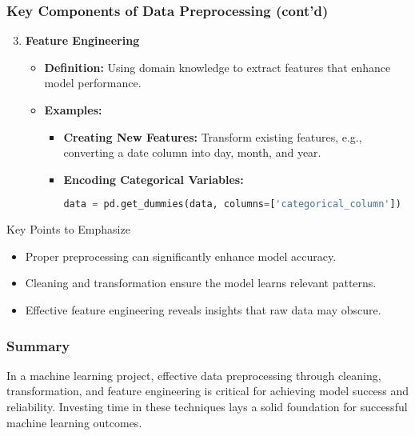 \documentclass[aspectratio=169]{beamer}
\begin{document}
\begin{frame}[fragile]
    \frametitle{Key Components of Data Preprocessing (cont'd)}
    \begin{enumerate}
        \setcounter{enumi}{2}
        \item \textbf{Feature Engineering}
        \begin{itemize}
            \item \textbf{Definition:} Using domain knowledge to extract features that enhance model performance.
            \item \textbf{Examples:}
            \begin{itemize}
                \item \textbf{Creating New Features:} Transform existing features, e.g., converting a date column into day, month, and year.
                \item \textbf{Encoding Categorical Variables:}
                \begin{lstlisting}[language=Python]
data = pd.get_dummies(data, columns=['categorical_column'])
                \end{lstlisting}
            \end{itemize}
        \end{itemize}
    \end{enumerate}

    \begin{block}{Key Points to Emphasize}
        \begin{itemize}
            \item Proper preprocessing can significantly enhance model accuracy.
            \item Cleaning and transformation ensure the model learns relevant patterns.
            \item Effective feature engineering reveals insights that raw data may obscure.
        \end{itemize}
    \end{block}
\end{frame}

\begin{frame}
    \frametitle{Summary}
    In a machine learning project, effective data preprocessing through cleaning, transformation, and feature engineering is critical for achieving model success and reliability. Investing time in these techniques lays a solid foundation for successful machine learning outcomes.
\end{frame}
\end{document}
